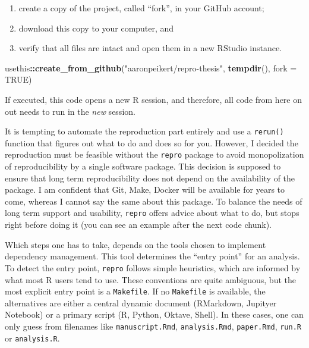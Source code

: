 \documentclass[12pt,a4paper,twoside]{article}
\newenvironment{Shaded}{\begin{snugshade}}{\end{snugshade}}
\newcommand{\DataTypeTok}[1]{\textcolor[rgb]{0.13,0.29,0.53}{#1}}
\newcommand{\KeywordTok}[1]{\textcolor[rgb]{0.13,0.29,0.53}{\textbf{#1}}}
\newcommand{\NormalTok}[1]{#1}
\newcommand{\OperatorTok}[1]{\textcolor[rgb]{0.81,0.36,0.00}{\textbf{#1}}}
\newcommand{\OtherTok}[1]{\textcolor[rgb]{0.56,0.35,0.01}{#1}}
\newcommand{\StringTok}[1]{\textcolor[rgb]{0.31,0.60,0.02}{#1}}
\providecommand{\tightlist}{%
  \setlength{\itemsep}{0pt}\setlength{\parskip}{0pt}}
\begin{document}
\begin{enumerate}
\def\labelenumi{\arabic{enumi}.}
\tightlist
\item
  create a copy of the project, called ``fork'', in your GitHub account;
\item
  download this copy to your computer, and
\item
  verify that all files are intact and open them in a new RStudio instance.
\end{enumerate}

\begin{Shaded}
\begin{Highlighting}[]
\NormalTok{usethis}\OperatorTok{::}\KeywordTok{create_from_github}\NormalTok{(}\StringTok{"aaronpeikert/repro-thesis"}\NormalTok{,}
                            \KeywordTok{tempdir}\NormalTok{(),}
                            \DataTypeTok{fork =} \OtherTok{TRUE}\NormalTok{)}
\end{Highlighting}
\end{Shaded}

If executed, this code opens a new R session, and therefore, all code from here on out needs to run in the \emph{new} session.

It is tempting to automate the reproduction part entirely and use a \texttt{rerun()} function that figures out what to do and does so for you.
However, I decided the reproduction must be feasible without the \texttt{repro} package to avoid monopolization of reproducibility by a single software package.
This decision is supposed to ensure that long term reproducibility does not depend on the availability of the package.
I am confident that Git, Make, Docker will be available for years to come, whereas I cannot say the same about this package.
To balance the needs of long term support and usability, \texttt{repro} offers advice about what to do, but stops right before doing it (you can see an example after the next code chunk).

Which steps one has to take, depends on the tools chosen to implement dependency management.
This tool determines the ``entry point'' for an analysis.
To detect the entry point, \texttt{repro} follows simple heuristics, which are informed by what most R users tend to use.
These conventions are quite ambiguous, but the most explicit entry point is a \texttt{Makefile}.
If no \texttt{Makefile} is available, the alternatives are either a central dynamic document (RMarkdown, Jupityer Notebook) or a primary script (R, Python, Oktave, Shell).
In these cases, one can only guess from filenames like \texttt{manuscript.Rmd}, \texttt{analysis.Rmd}, \texttt{paper.Rmd}, \texttt{run.R} or \texttt{analysis.R}.
\end{document}
